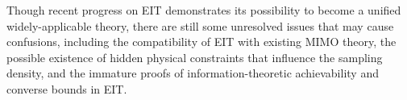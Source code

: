 \documentclass[journal,twocolumn]{IEEEtran}
\begin{document}
Though recent progress on EIT demonstrates its possibility to become a unified widely-applicable theory, there are still some unresolved issues that may cause confusions, including the compatibility of EIT with existing MIMO theory, the possible existence of hidden physical constraints that influence the sampling density, and the immature proofs of information-theoretic achievability and converse bounds in EIT. 


\footnotesize



\end{document}
